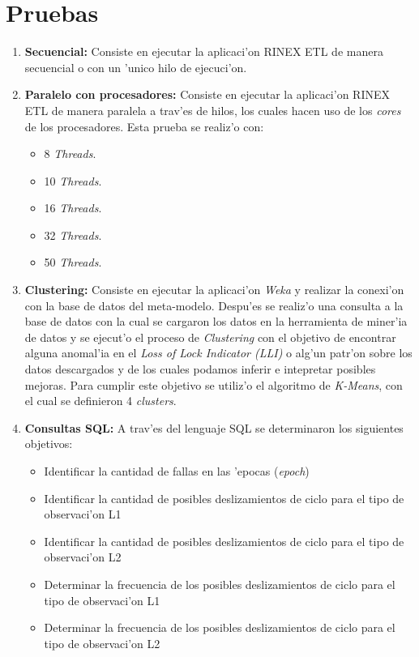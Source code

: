 \section{Pruebas}
\noindent
\begin{enumerate}
\item \textbf{Secuencial:} Consiste en ejecutar la aplicaci'on RINEX ETL de manera secuencial o con un 'unico hilo de ejecuci'on.
\item \textbf{Paralelo con procesadores:} Consiste en ejecutar la aplicaci'on RINEX ETL de manera paralela a trav'es de hilos, los cuales hacen uso de los \emph{cores} de los procesadores. 
Esta prueba se realiz'o con:
\begin{itemize}
\item 8 \emph{Threads}.
\item 10 \emph{Threads}.
\item 16 \emph{Threads}.
\item 32 \emph{Threads}.
\item 50 \emph{Threads}.
\end{itemize}
\item \textbf{Clustering:} Consiste en ejecutar la aplicaci'on \emph{Weka} y realizar la conexi'on con la base de datos del meta-modelo. Despu'es se realiz'o una consulta a la base de datos con la cual se cargaron los datos en la herramienta de miner'ia de datos y se ejecut'o el proceso de \emph{Clustering} con el objetivo de encontrar alguna anomal'ia en el \emph{Loss of Lock Indicator (LLI)} o alg'un patr'on sobre los datos descargados y de los cuales podamos inferir e intepretar posibles mejoras. Para cumplir este objetivo se utiliz'o el algoritmo de \emph{K-Means}, con el cual se definieron 4 \emph{clusters}.\\
\item \textbf{Consultas SQL:} A trav'es del lenguaje SQL se determinaron los siguientes objetivos:
\begin{itemize}
\item Identificar la cantidad de fallas en las 'epocas (\emph{epoch})
\item Identificar la cantidad de posibles deslizamientos de ciclo para el tipo de observaci'on L1
\item Identificar la cantidad de posibles deslizamientos de ciclo para el tipo de observaci'on L2
\item Determinar la frecuencia de los posibles deslizamientos de ciclo para el tipo de observaci'on L1
\item Determinar la frecuencia de los posibles deslizamientos de ciclo para el tipo de observaci'on L2
\end{itemize}

\end{enumerate}

\clearpage